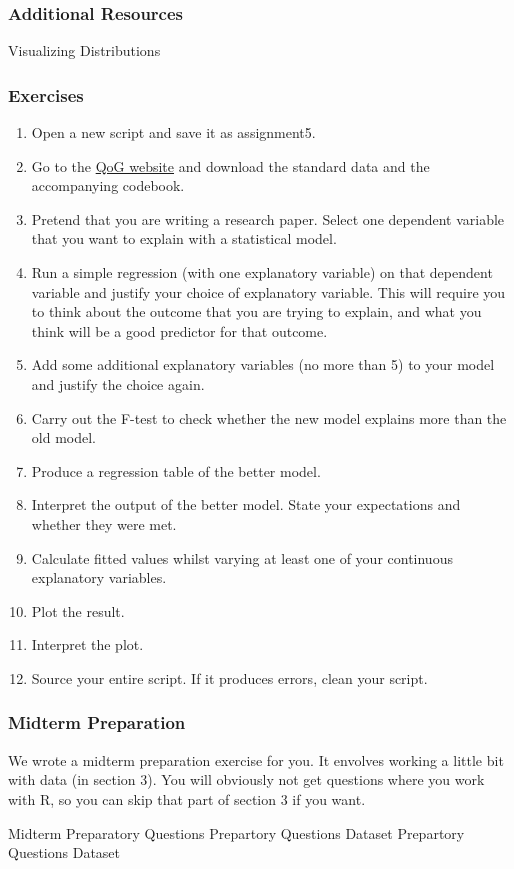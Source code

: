 \documentclass[]{article}
\providecommand{\tightlist}{%
  \setlength{\itemsep}{0pt}\setlength{\parskip}{0pt}}
\theoremstyle{definition}
\theoremstyle{definition}
\theoremstyle{definition}
\theoremstyle{remark}
\begin{document}
\subsubsection{Additional Resources}\label{additional-resources-1}

Visualizing Distributions

\subsubsection{Exercises}\label{exercises-6}

\begin{enumerate}
\def\labelenumi{\arabic{enumi}.}
\tightlist
\item
  Open a new script and save it as assignment5.
\item
  Go to the
  \href{http://qog.pol.gu.se/data/datadownloads/qogstandarddata}{QoG
  website} and download the standard data and the accompanying codebook.
\item
  Pretend that you are writing a research paper. Select one dependent
  variable that you want to explain with a statistical model.
\item
  Run a simple regression (with one explanatory variable) on that
  dependent variable and justify your choice of explanatory variable.
  This will require you to think about the outcome that you are trying
  to explain, and what you think will be a good predictor for that
  outcome.
\item
  Add some additional explanatory variables (no more than 5) to your
  model and justify the choice again.
\item
  Carry out the F-test to check whether the new model explains more than
  the old model.
\item
  Produce a regression table of the better model.
\item
  Interpret the output of the better model. State your expectations and
  whether they were met.
\item
  Calculate fitted values whilst varying at least one of your continuous
  explanatory variables.
\item
  Plot the result.
\item
  Interpret the plot.
\item
  Source your entire script. If it produces errors, clean your script.
\end{enumerate}

\subsubsection{Midterm Preparation}\label{midterm-preparation}

We wrote a midterm preparation exercise for you. It envolves working a
little bit with data (in section 3). You will obviously not get
questions where you work with R, so you can skip that part of section 3
if you want.

Midterm Preparatory Questions Prepartory Questions Dataset Prepartory
Questions Dataset
\end{document}
